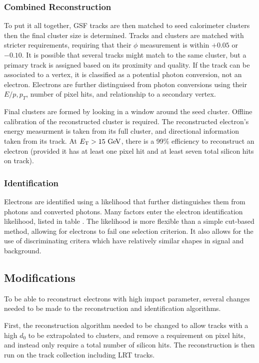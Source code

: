 \subsubsection{Combined Reconstruction}
To put it all together, \ac{GSF} tracks are then matched to seed calorimeter clusters then the final cluster size is determined. Tracks and clusters are matched with stricter requirements, requiring that their $\phi$ measurement is within $+0.05$ or $-0.10$. It is possible that several tracks might match to the same cluster, but a primary track is assigned based on its proximity and quality. If the track can be associated to a vertex, it is classified as a potential photon conversion, not an electron. Electrons are further distinguised from photon conversions using their $E/p, p_{T}$, number of pixel hits, and relationship to a secondary vertex. 

Final clusters are formed by looking in a window around the seed cluster. Offline calibration of the reconstructed cluster is required. The reconstructed electron's energy measurment is taken from its full cluster, and directional information taken from its track. At $\et > 15 \GeV$, there is a 99\% efficiency to reconstruct an electron (provided it has at least one pixel hit and at least seven total silicon hits on track). 


\subsubsection{Identification}

Electrons are identified using a likelihood that further distinguishes them from photons and converted photons. Many factors enter the electron identification likelihood, listed in table . The likelihood is more flexible than a simple cut-based method, allowing for electrons to fail one selection criterion. It also allows for the use of discriminating critera which have relatively similar shapes in signal and background.


\subsection{Modifications}
To be able to reconstruct electrons with high impact parameter, several changes needed to be made to the reconstruction and identification algorithms. 

First, the reconstruction algorithm needed to be changed to allow tracks with a high $d_{0}$ to be extrapolated to clusters, and remove a requirement on pixel hits, and instead only require a total number of silicon hits. The reconstruction is then run on the track collection including \ac{LRT} tracks. 

